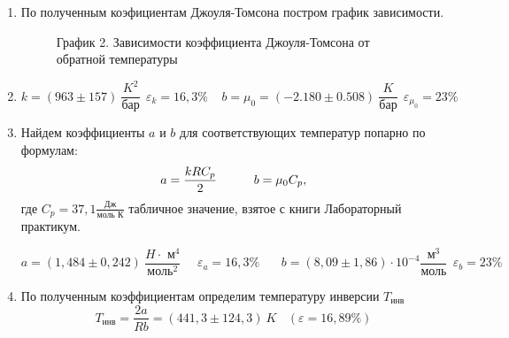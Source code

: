 \documentclass[a4paper,12pt]{article}
\begin{document}
\begin{enumerate}
    \item По полученным коэфициентам Джоуля-Томсона постром график зависимости.

    \begin{figure}[h!]
\caption[]{\label{} График 2. Зависимости коэффициента Джоуля-Томсона от обратной температуры}
\end{figure}
    \item \[k = (963 \pm 157) \ \frac{K^2}{\text{бар}} \ \ \varepsilon_k = 16,3 \% \ \ \ \ \ b = \mu_0 = (-2.180 \pm 0.508) \ \frac{K}{\text{бар}} \ \ \varepsilon_{\mu_0} = 23 \% \]

    \item Найдем коэффициенты $a$ и $b$ для соответствующих температур попарно по формулам:
    \[a = \frac{kRC_p}{2} \ \ \ \ \ \ \ \ \ \ \\  b= \mu_0 C_p,\] где $C_p = 37,1 \frac{\text{Дж}}{\text{моль \ К}}$ табличное значение, взятое с книги Лабораторный практикум.
    
    \[a  = (1,484 \pm 0,242) \  \frac{H\cdot\text{ м} ^4}{\text{моль} ^2}  \ \ \ \ \ \ \varepsilon_a = 16,3 \%\ \ \ \ \ \ \ \ b = (8,09 \pm 1,86) \cdot 10^{-4} \frac{\text{м} ^3}{\text{моль}} \ \ \varepsilon_b = 23 \%\]

    \item По полученным коэффициентам определим температуру инверсии $T_{\text{инв}}$
\begin{equation*}
	T_{\text{инв}} = \frac{2a}{Rb} = (441,3 \pm 124,3) \ K \ \ \ \ (\varepsilon = 16,89 \%)
\end{equation*}

	
    
\end{enumerate}
\end{document}
